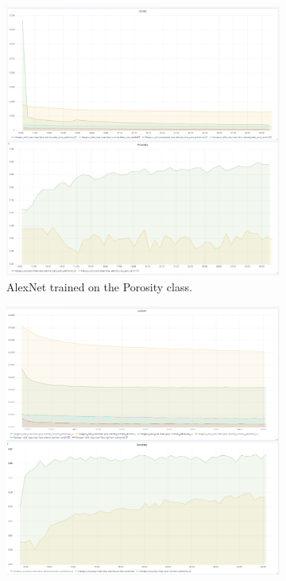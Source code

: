 \begin{figure}
\begin{subfigure}{.6\textwidth}
  \centering
  \includegraphics[width=1\linewidth]{figures/04-Init_al_poro_acc.PNG}
  \caption{AlexNet trained on the Porosity class.}
  \label{fig:alexinit_poro}
\end{subfigure}%
\begin{subfigure}{.6\textwidth}
  \centering
  \includegraphics[width=1\linewidth]{figures/04-Init_al_dunham_acc.PNG}

\end{subfigure}
\end{figure}
